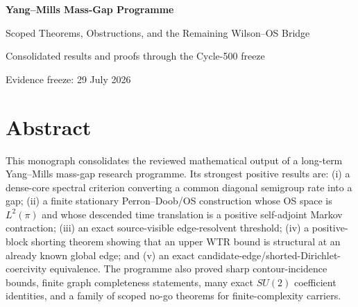 \documentclass[11pt,oneside]{report}
\theoremstyle{definition}
\theoremstyle{remark}
\begin{document}
\begin{titlepage}
\centering
\vspace*{1.1in}
{\Huge\bfseries Yang--Mills Mass-Gap Programme\par}
\vspace{0.3in}
{\LARGE Scoped Theorems, Obstructions, and the Remaining Wilson--OS Bridge\par}
\vspace{0.25in}
{\Large Consolidated results and proofs through the Cycle-500 freeze\par}
\vfill
{}
\vfill
{\large Evidence freeze: 29 July 2026\par}
\end{titlepage}

\chapter*{Abstract}
This monograph consolidates the reviewed mathematical output of a long-term
Yang--Mills mass-gap research programme. Its strongest positive results are:
(i) a dense-core spectral criterion converting a common diagonal semigroup
rate into a gap; (ii) a finite stationary Perron--Doob/OS construction whose
OS space is $L^2(\pi)$ and whose descended time translation is a positive
self-adjoint Markov contraction; (iii) an exact source-visible edge-resolvent
threshold; (iv) a positive-block shorting theorem showing that an upper WTR
bound is structural at an already known global edge; and (v) an exact
candidate-edge/shorted-Dirichlet-coercivity equivalence. The programme also
proved sharp contour-incidence bounds, finite graph completeness statements,
many exact $SU(2)$ coefficient identities, and a family of scoped no-go
theorems for finite-complexity carriers.
\end{document}
